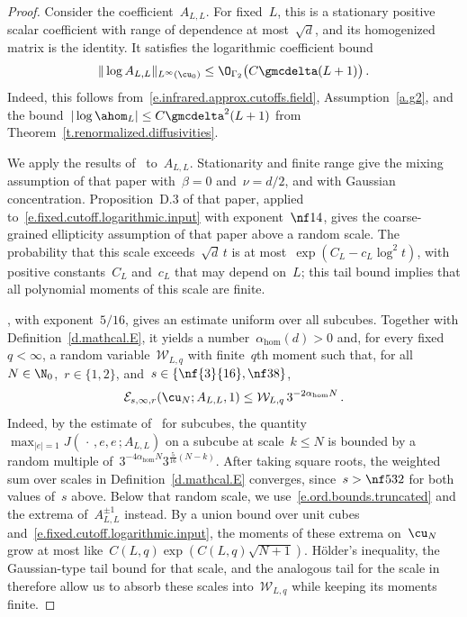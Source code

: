 \documentclass[11pt]{amsart}
\begin{document}
\begin{proof}
Consider the coefficient~$A_{L,L}$. For fixed~$L$, this is a stationary positive scalar coefficient with range of dependence at most~$\sqrt d$, and its homogenized matrix is the identity.  It satisfies the logarithmic coefficient bound
\begin{equation}
	\|\log A_{L,L}\|_{L^\infty(\cu_0)}
	\leq\O_{\Gamma_2}\bigl(C\gmcdelta(L+1)\bigr)\,.
	\label{e.fixed.cutoff.logarithmic.input}
\end{equation}
Indeed, this follows from~\eqref{e.infrared.approx.cutoffs.field}, Assumption~\ref{a.g2}, and the bound~$|\log \ahom_L|\leq C\gmcdelta^2(L+1)$ from Theorem~\ref{t.renormalized.diffusivities}.

\smallskip

We apply the results of~\citet[Theorem~B, pp.~9--10; Theorem~4.1, pp.~73--74; and Proposition~D.3, pp.~145--146]{AK.HC} to~$A_{L,L}$.  Stationarity and finite range give the mixing assumption of that paper with~$\beta=0$ and~$\nu=d/2$, and with Gaussian concentration.  Proposition~D.3 of that paper, applied to~\eqref{e.fixed.cutoff.logarithmic.input} with exponent~$\nf14$, gives the coarse-grained ellipticity assumption of that paper above a random scale. The probability that this scale exceeds~$\sqrt d\,t$ is at most~$\exp(C_L-c_L\log^2t)$, with positive constants~$C_L$ and~$c_L$ that may depend on~$L$; this tail bound implies that all polynomial moments of this scale are finite.

\smallskip

\citet[Corollary~4.3, p.~76]{AK.HC}, with exponent~$5/16$, gives an estimate uniform over all subcubes. Together with Definition~\ref{d.mathcal.E}, it yields a number~$\alpha_{\mathrm{hom}}(d)>0$ and, for every fixed~$q<\infty$, a random variable~$\mathcal W_{L,q}$ with finite~$q$th moment such that, for all~$N\in\N_0$,~$r\in\{1,2\}$, and~$s\in\{\nf{3}{16},\nf38\}$,
\begin{equation}
	\mathcal E_{s,\infty,r}(\cu_N;A_{L,L},1)
	\leq
	\mathcal W_{L,q}\,3^{-2\alpha_{\mathrm{hom}}N}\,.
	\label{e.fixed.cutoff.response.algebraic}
\end{equation}
Indeed, by the estimate of~\citet[Corollary~4.3, p.~76]{AK.HC} for subcubes, the quantity~$\max_{|e|=1}J(\,\cdot\,,e,e\,;A_{L,L})$ on a subcube at scale~$k\leq N$ is bounded by a random multiple of~$3^{-4\alpha_{\mathrm{hom}}N}3^{\frac{5}{16}(N-k)}$. After taking square roots, the weighted sum over scales in Definition~\ref{d.mathcal.E} converges, since~$s>\nf5{32}$ for both values of~$s$ above. Below that random scale, we use~\eqref{e.ord.bounds.truncated} and the extrema of~$A_{L,L}^{\pm1}$ instead. By a union bound over unit cubes and~\eqref{e.fixed.cutoff.logarithmic.input}, the moments of these extrema on~$\cu_N$ grow at most like~$C(L,q)\exp(C(L,q)\sqrt{N+1})$. H\"older's inequality, the Gaussian-type tail bound for that scale, and the analogous tail for the scale in~\citet[Corollary~4.3]{AK.HC} therefore allow us to absorb these scales into~$\mathcal W_{L,q}$ while keeping its moments finite.


\end{proof}
\end{document}
